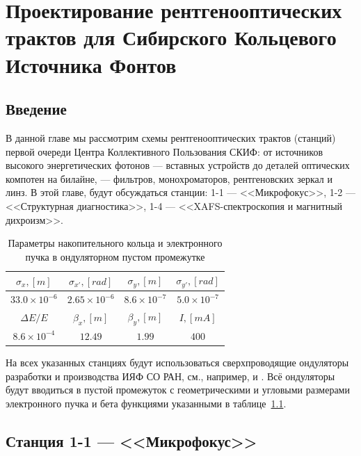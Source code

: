 \chapter{Проектирование рентгенооптических трактов для Сибирского Кольцевого Источника Фонтов}

\section{Введение}
В данной главе мы рассмотрим схемы рентгенооптических трактов (станций) первой очереди Центра Коллективного Пользования СКИФ: от источников высокого энергетических фотонов --- вставных устройств до деталей оптических компотен на билайне, --- фильтров, монохроматоров, рентгеновских зеркал и линз. В этой главе, будут обсуждаться станции: 1-1 --- <<Микрофокус>>, 1-2 --- <<Структурная диагностика>>, 1-4 --- <<XAFS-спектроскопия и магнитный дихроизм>>.  
\begin{table}[h!]
	\centering
	\begin{tabular}{c|c|c|c}
		\hline\hline
		\rule{0pt}{3ex}   $\sigma_x, [m]$ & $\sigma_{x'}, [rad]$ & $\sigma_y, [m]$     & $\sigma_{y'}, [rad]$ \\ \hline
		\rule{0pt}{3ex}   $33.0 \times 10^{-6}$  & $2.65 \times 10^{-6}$  &  $8.6 \times 10^{-7}$ & $5.0 \times 10^{-7}$   \\
		\hline	\hline
		\rule{0pt}{3ex}   $\Delta E / E$ & $\beta_x,[m]$ & $\beta_y,[m]$   & $I,[mA]$\\ \hline
		\rule{0pt}{3ex}	 $8.6 \times 10^{-4}$ & $12.49$ & $1.99$ & $400$ \\ \hline\hline
	\end{tabular}
	\vspace{4pt} 
	\caption{Параметры накопительного кольца и электронного пучка в ондуляторном пустом промежутке}
	\label{table:ebeam}
\end{table}

На всех указанных станциях будут использоваться сверхпроводящие ондуляторы разработки и производства ИЯФ СО РАН, см., например, \cite{bragin2018short} и \cite{gluskin2019superconducting}. Всё ондуляторы будут вводиться в пустой промежуток с геометрическими и угловыми размерами электронного пучка и бета функциями указанными в таблице~\ref{table:ebeam}. 

\section{Станция 1-1 --- <<Микрофокус>>}
